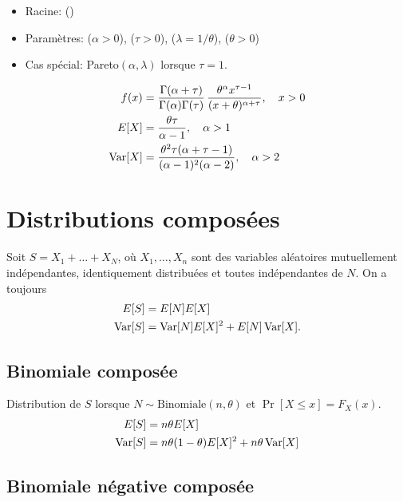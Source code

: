 \begin{itemize}
\item Racine:  ()
\item Paramètres:  ($\alpha > 0$),
       ($\tau > 0$),
         ($\lambda = 1/\theta$),
        ($\theta > 0$)
\end{itemize}
\begin{itemize}
\item Cas spécial: Pareto$(\alpha, \lambda)$ lorsque $\tau = 1$.
\end{itemize}
\begin{align*}
  f(x) &=
  \frac{\Gamma(\alpha + \tau)}{\Gamma(\alpha) \Gamma(\tau)}\,
  \frac{\theta^\alpha x^{\tau - 1}}{(x + \theta)^{\alpha+\tau}},
  \quad x > 0 \\
  E [ X ]
  &= \frac{\theta \tau}{\alpha - 1}, \quad \alpha > 1 \\
  \operatorname{Var} [ X ]
  &= \frac{\theta^2 \tau (\alpha + \tau - 1)}{(\alpha - 1)^2 (\alpha
    - 2)}, \quad \alpha > 2
\end{align*}


\section{Distributions composées}

Soit $S = X_1 + \dots + X_N$, où $X_1, \dots, X_n$ sont des variables
aléatoires mutuellement indépendantes, identiquement distribuées et
toutes indépendantes de $N$. On a toujours
\begin{align*}
  E [ S ] &= E [ N ] E [ X ] \\
  \operatorname{Var} [ S ] &= \operatorname{Var} [ N ] E [ X ]^2 + E [ N ] \operatorname{Var} [ X ].
\end{align*}

\subsection{Binomiale composée}
\label{distributions:binomialecomposée}

Distribution de $S$ lorsque $N \sim \text{Binomiale}(n, \theta)$ et
$\Pr[X \leq x] = F_X(x)$.
\begin{align*}
  E [ S ] &= n \theta E [ X ] \\
  \operatorname{Var} [ S ] &= n\theta(1 - \theta) E [ X ]^2 + n \theta \operatorname{Var} [ X ]
\end{align*}

\subsection{Binomiale négative composée}
\label{distributions:binomialenegativecomposée}

